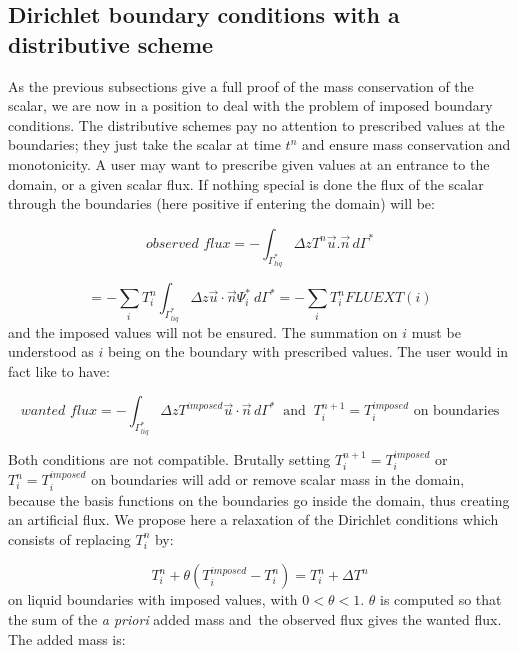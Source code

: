 \subsection{\label{dirichletdistributif}Dirichlet boundary conditions with a
distributive scheme%
%
}

As the previous subsections give a full proof of the mass conservation of the
scalar, we are now in a position to deal with the problem of imposed boundary
conditions. The distributive schemes pay no attention to prescribed values at
the boundaries; they just take the scalar at time $t^{n}$ and ensure mass
conservation and monotonicity. A user may want to prescribe given values at an
entrance to the domain, or a given scalar flux. If nothing special is done the
flux of the scalar through the boundaries (here positive if entering the
domain) will be:%

\begin{equation}
observed\,\,flux=-\int\nolimits_{\Gamma_{liq}^{\ast}}\Delta zT^{n}%
\vec{u}.\vec{n}\,d\Gamma^{\ast}%
\end{equation}
%

\begin{equation}
=-\sum\limits_{i\,}T_{i}^{n}\int\nolimits_{\Gamma_{liq}^{\ast}}\Delta
z\vec{u}\cdot\vec{n}\Psi_{i}^{\ast}~d\Gamma^{\ast}=-\sum\limits_{i\,}%
T_{i}^{n}FLUEXT(i)
\end{equation}
and the imposed values will not be ensured. The summation on $i$ must be
understood as $i$ being on the boundary with prescribed values. The user would
in fact like to have:%

\begin{equation}
wanted\,\,flux=-\int\nolimits_{\Gamma_{liq}^{\ast}}\Delta zT^{imposed}%
\vec{u}\cdot\vec{n}\,d\Gamma^{\ast}\ \text{\ and }\ T_{i}^{n+1}%
=T_{i}^{imposed}\text{ on boundaries}%
\end{equation}


Both conditions are not compatible. Brutally setting $T_{i}^{n+1}%
=T_{i}^{imposed}$ or $T_{i}^{n}=T_{i}^{imposed}$ on boundaries will add or
remove scalar mass in the domain, because the basis functions on the
boundaries go inside the domain, thus creating an artificial flux. We propose
here a relaxation of the Dirichlet conditions which consists of replacing
$T_{i}^{n}$ by:%

\begin{equation}
T_{i}^{n}+\theta(T_{i}^{imposed}-T_{i}^{n})=T_{i}^{n}+\Delta T^{n}
\label{apriori}%
\end{equation}
on liquid boundaries with imposed values, with $0<\theta<1$. $\theta$ is
computed so that the sum of the \textit{a priori} added mass and\ the observed
flux gives the wanted flux. The added mass is:%

